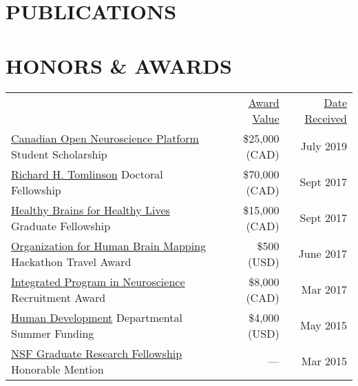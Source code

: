 \documentclass{dupre-cv}
\begin{document}
\vspace{8pt}

\section{PUBLICATIONS}


\section{HONORS \& AWARDS}
\vspace{-7pt}

\noindent\begin{tabularx}{\textwidth}{@{}lrr@{}}

& \underline{Award Value} & \underline{Date Received} \\

 \href{https://conp.ca/}{Canadian Open Neuroscience Platform} Student Scholarship & \$25,000 (CAD) & July 2019 \\

\href{https://www.mcgill.ca/gps/funding/achievements/tomlinsonscholars}{Richard H. Tomlinson} Doctoral Fellowship & \$70,000 (CAD) & Sept 2017 \\

\href{https://www.mcgill.ca/hbhl/about-hbhl}{Healthy Brains for Healthy Lives} Graduate Fellowship & \$15,000 (CAD) & Sept 2017 \\

\href{https://ohbm.github.io/hackathon2017/}{Organization for Human Brain Mapping} Hackathon Travel Award & \$500 (USD) & June 2017 \\

\href{http://www.mcgill.ca/ipn/}{Integrated Program in Neuroscience} Recruitment Award & \$8,000 (CAD) & Mar 2017 \\

\href{http://www.human.cornell.edu/hd/}{Human Development} Departmental Summer Funding & \$4,000 (USD) & May 2015 \\

\href{https://www.nsfgrfp.org/}{NSF Graduate Research Fellowship} Honorable Mention & --- & Mar 2015
\end{tabularx}

\vspace{15pt}
\end{document}
